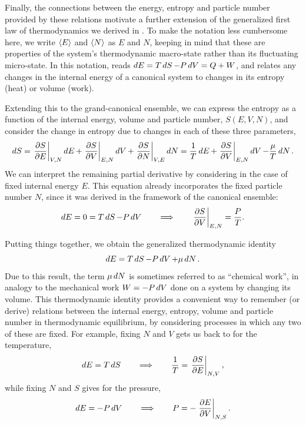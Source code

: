 Finally, the connections between the energy, entropy and particle number provided by these relations motivate a further extension of the generalized first law of thermodynamics we derived in .
To make the notation less cumbersome here, we write $\left\langle E \right\rangle$ and $\left\langle N \right\rangle$ as $E$ and $N$, keeping in mind that these are properties of the system's thermodynamic macro-state rather than its fluctuating micro-state.
In this notation,  reads $\mathop{dE} = T \mathop{dS} - P \mathop{dV} = Q + W$, and relates any changes in the internal energy of a canonical system to changes in its entropy (heat) or volume (work).

Extending this to the grand-canonical ensemble, we can express the entropy as a function of the internal energy, volume and particle number, $S(E, V, N)$, and consider the change in entropy due to changes in each of these three parameters,
\begin{equation*}
  \mathop{dS} = \left.\frac{\partial S}{\partial E}\right|_{V, N} \mathop{dE} + \left.\frac{\partial S}{\partial V}\right|_{E, N} \mathop{dV} + \left.\frac{\partial S}{\partial N}\right|_{V, E} \mathop{dN} = \frac{1}{T} \mathop{dE} + \left.\frac{\partial S}{\partial V}\right|_{E, N} \mathop{dV} - \frac{\mu}{T} \mathop{dN}.
\end{equation*}
We can interpret the remaining partial derivative by considering  in the case of fixed internal energy $E$.
This equation already incorporates the fixed particle number $N$, since it was derived in the framework of the canonical ensemble:
\begin{equation*}
  \mathop{dE} = 0 = T \mathop{dS} - P \mathop{dV} \qquad \Longrightarrow \qquad \left.\frac{\partial S}{\partial V}\right|_{E, N} = \frac{P}{T}.
\end{equation*}

Putting things together, we obtain the generalized thermodynamic identity
\begin{equation}
  \label{eq:thermo_ident}
  \mathop{dE} = T \mathop{dS} - P \mathop{dV} + \mu \mathop{dN}.
\end{equation}
Due to this result, the term $\mu \mathop{dN}$ is sometimes referred to as ``chemical work'', in analogy to the mechanical work $W = - P \mathop{dV}$ done on a system by changing its volume.
This thermodynamic identity provides a convenient way to remember (or derive) relations between the internal energy, entropy, volume and particle number in thermodynamic equilibrium, by considering processes in which any two of these are fixed.
For example, fixing $N$ and $V$ gets us back to  for the temperature,
\begin{equation*}
  \mathop{dE} = T \mathop{dS} \qquad \Longrightarrow \qquad \frac{1}{T} = \left.\frac{\partial S}{\partial E}\right|_{N, V},
\end{equation*}
while fixing $N$ and $S$ gives  for the pressure,
\begin{equation*}
  \mathop{dE} = -P \mathop{dV} \qquad \Longrightarrow \qquad P = -\left.\frac{\partial E}{\partial V}\right|_{N, S}.
\end{equation*}

